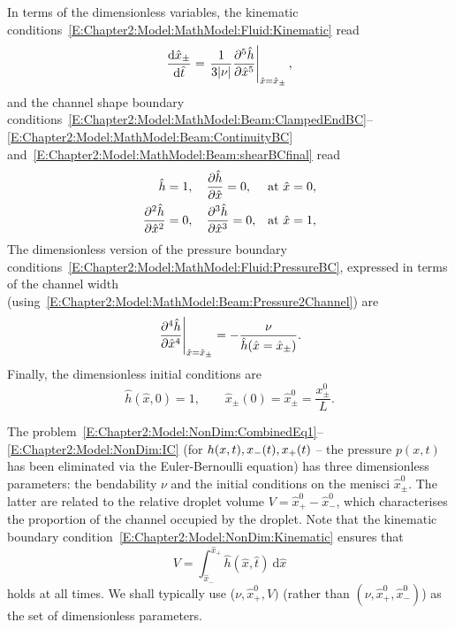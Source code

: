 In terms of the dimensionless variables, the kinematic conditions~\eqref{E:Chapter2:Model:MathModel:Fluid:Kinematic}  read
\begin{equation}\label{E:Chapter2:Model:NonDim:Kinematic}
\frac{\mathrm{d} \hat{x}_{\pm}}{\mathrm{d} \hat{t}}  = \left.\frac{1}{3|\nu|}\frac{\partial ^5\hat{h}}{\partial \hat{x}^5} \right|_{\hat{x} = \hat{x}_{\pm}},
\end{equation}
and the channel shape boundary conditions~\eqref{E:Chapter2:Model:MathModel:Beam:ClampedEndBC}--\eqref{E:Chapter2:Model:MathModel:Beam:ContinuityBC} and~\eqref{E:Chapter2:Model:MathModel:Beam:shearBCfinal} read
\begin{align}
\hat{h} &= 1,\quad \frac{\partial \hat{h}}{\partial \hat{x}} = 0, & & \text{at}~ \hat{x} = 0,\label{E:Chapter2:Model:NonDim:BCClamped}\\
\frac{\partial ^2 \hat{h}}{\partial \hat{x}^2} &= 0, \quad\frac{\partial ^3\hat{h}}{\partial \hat{x}^3} = 0, & &   \text{at}~ \hat{x} = 1\label{E:Chapter2:Model:NonDim:BCFree},
\end{align}
The dimensionless version of the pressure boundary conditions~\eqref{E:Chapter2:Model:MathModel:Fluid:PressureBC}, expressed in terms of the channel width (using~\eqref{E:Chapter2:Model:MathModel:Beam:Pressure2Channel}) are
\begin{equation}\label{E:Chapter2:Model:NonDim:BCPressure}
\left.\frac{\partial ^4 \hat{h}}{\partial \hat{x}^4}\right|_{\hat{x} = \hat{x}_{\pm}} = -\frac{\nu}{\hat{h}(\hat{x} = \hat{x}_{\pm})}.
\end{equation}
Finally, the dimensionless initial conditions are
\begin{equation}\label{E:Chapter2:Model:NonDim:IC}
\hat{h}(\hat{x}, 0) = 1, \qquad \hat{x}_{\pm}(0) =\hat{x}_{\pm}^0 = \frac{x_{\pm}^0}{L}.
\end{equation}

The problem~\eqref{E:Chapter2:Model:NonDim:CombinedEq1}--\eqref{E:Chapter2:Model:NonDim:IC} (for $h(x,t), x_{-}(t), x_{+}(t)$ -- the pressure $p(x,t)$ has been eliminated via the Euler-Bernoulli equation) has three dimensionless parameters: the bendability $\nu$ and the initial conditions on the menisci $\hat{x}_{\pm}^0$. The latter are related to the relative droplet volume $V = \hat{x}_+^0 - \hat{x}_-^0$, which characterises the proportion of the channel occupied by the droplet. Note that the kinematic boundary condition~\eqref{E:Chapter2:Model:NonDim:Kinematic} ensures that
\begin{equation}
V = \int_{\hat{x}_-}^{\hat{x}_+}\hat{h}(\hat{x},\hat{t})~\mathrm{d}\hat{x}
\end{equation}
holds at all times. We shall typically use ($\nu, \hat{x}_+^0, V)$ (rather than $(\nu, \hat{x}_+^0, \hat{x}_-^0)$) as the set of dimensionless parameters.

